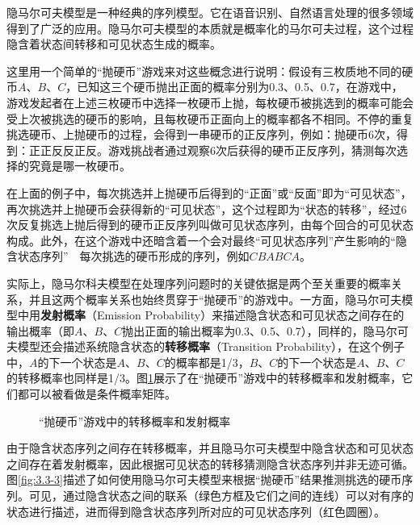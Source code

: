 \parinterval 隐马尔可夫模型是一种经典的序列模型。它在语音识别、自然语言处理的很多领域得到了广泛的应用。隐马尔可夫模型的本质就是概率化的马尔可夫过程，这个过程隐含着状态间转移和可见状态生成的概率。

\parinterval 这里用一个简单的“抛硬币”游戏来对这些概念进行说明：假设有三枚质地不同的硬币$A$、$B$、$C$，已知这三个硬币抛出正面的概率分别为0.3、0.5、0.7，在游戏中，游戏发起者在上述三枚硬币中选择一枚硬币上抛，每枚硬币被挑选到的概率可能会受上次被挑选的硬币的影响，且每枚硬币正面向上的概率都各不相同。不停的重复挑选硬币、上抛硬币的过程，会得到一串硬币的正反序列，例如：抛硬币6次，得到：正正反反正反。游戏挑战者通过观察6次后获得的硬币正反序列，猜测每次选择的究竟是哪一枚硬币。

\parinterval 在上面的例子中，每次挑选并上抛硬币后得到的“正面”或“反面”即为“可见状态”，再次挑选并上抛硬币会获得新的“可见状态”，这个过程即为“状态的转移”，经过6次反复挑选上抛后得到的硬币正反序列叫做可见状态序列，由每个回合的可见状态构成。此外，在这个游戏中还暗含着一个会对最终“可见状态序列”产生影响的“隐含状态序列”\ \dash \ 每次挑选的硬币形成的序列，例如$CBABCA$。

\parinterval 实际上，隐马尔科夫模型在处理序列问题时的关键依据是两个至关重要的概率关系，并且这两个概率关系也始终贯穿于“抛硬币”的游戏中。一方面，隐马尔可夫模型中用{\small\sffamily\bfseries{发射概率}}（Emission Probability）来描述隐含状态和可见状态之间存在的输出概率（即$A$、$B$、$C$抛出正面的输出概率为0.3、0.5、0.7），同样的，隐马尔可夫模型还会描述系统隐含状态的{\small\sffamily\bfseries{转移概率}}（Transition Probability），在这个例子中，$A$的下一个状态是$A$、$B$、$C$的概率都是1/3，$B$、$C$的下一个状态是$A$、$B$、$C$的转移概率也同样是1/3。图\ref{fig:3.3-2}展示了在“抛硬币”游戏中的转移概率和发射概率，它们都可以被看做是条件概率矩阵。

\begin{figure}[htp]
\centering

\caption{“抛硬币”游戏中的转移概率和发射概率}
\label{fig:3.3-2}
\end{figure}

\parinterval 由于隐含状态序列之间存在转移概率，并且隐马尔可夫模型中隐含状态和可见状态之间存在着发射概率，因此根据可见状态的转移猜测隐含状态序列并非无迹可循。图\ref{fig:3.3-3}描述了如何使用隐马尔可夫模型来根据“抛硬币”结果推测挑选的硬币序列。可见，通过隐含状态之间的联系（绿色方框及它们之间的连线）可以对有序的状态进行描述，进而得到隐含状态序列所对应的可见状态序列（红色圆圈）。

